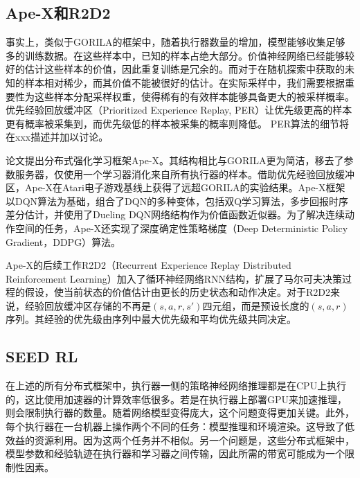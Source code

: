 \subsection{Ape-X和R2D2}

事实上，类似于GORILA的框架中，随着执行器数量的增加，模型能够收集足够多的训练数据。在这些样本中，已知的样本占绝大部分。价值神经网络已经能够较好的估计这些样本的价值，因此重复训练是冗余的。而对于在随机探索中获取的未知的样本相对稀少，而其价值不能被很好的估计。在实际采样中，我们需要根据重要性为这些样本分配采样权重，使得稀有的有效样本能够具备更大的被采样概率。优先经验回放缓冲区（Prioritized Experience Replay, PER）\cite{schaul2015prioritized}让优先级更高的样本更有概率被采集到，而优先级低的样本被采集的概率则降低。
PER算法的细节将在xxx描述并加以讨论。

论文\cite{horgan2018distributed}提出分布式强化学习框架Ape-X。其结构相比与GORILA更为简洁，移去了参数服务器，仅使用一个学习器消化来自所有执行器的样本。借助优先经验回放缓冲区，Ape-X在Atari电子游戏基线上获得了远超GORILA的实验结果。Ape-X框架以DQN算法为基础，组合了DQN的多种变体，包括双Q学习\cite{hasselt2010double, van2016deep}算法，多步回报时序差分估计，并使用了Dueling DQN网络结构\cite{wang2016dueling}作为价值函数近似器。为了解决连续动作空间的任务，Ape-X还实现了深度确定性策略梯度（Deep Deterministic Policy Gradient，DDPG）\cite{lillicrap2015continuous}算法。

Ape-X的后续工作R2D2（Recurrent Experience Replay Distributed Reinforcement Learning）\cite{kapturowski2018recurrent}加入了循环神经网络RNN结构，扩展了马尔可夫决策过程的假设，使当前状态的价值估计由更长的历史状态和动作决定。对于R2D2来说，经验回放缓冲区存储的不再是$(s,a,r,s')$四元组，而是预设长度的$(s,a,r)$序列。其经验的优先级由序列中最大优先级和平均优先级共同决定。

\subsection{SEED RL}

在上述的所有分布式框架中，执行器一侧的策略神经网络推理都是在CPU上执行的，这比使用加速器的计算效率低很多。若是在执行器上部署GPU来加速推理，则会限制执行器的数量。随着网络模型变得庞大，这个问题变得更加关键。此外，每个执行器在一台机器上操作两个不同的任务：模型推理和环境渲染。这导致了低效益的资源利用。因为这两个任务并不相似。另一个问题是，这些分布式框架中，模型参数和经验轨迹在执行器和学习器之间传输，因此所需的带宽可能成为一个限制性因素。

